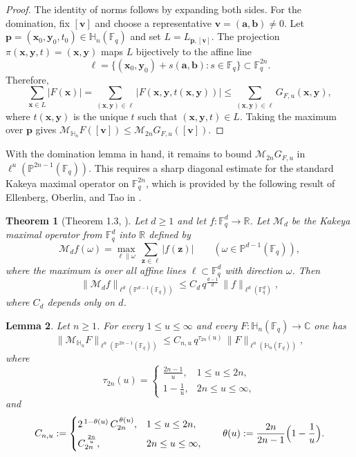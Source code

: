 \documentclass[11pt]{article}
\newtheorem{theorem}{Theorem}[section]
\newtheorem{lemma}[theorem]{Lemma}
\newcommand{\1}{\mathbf 1}
\newcommand{\bfp}{\mathbf{p}}
\begin{document}
\begin{proof}
The identity of norms follows by expanding both sides.
For the domination, fix $[\mathbf{v}]$ and choose a representative $\mathbf{v}=(\mathbf{a}, \mathbf{b})\ne 0$.
Let $\mathbf{p}=(\mathbf x_0, \mathbf y_0,t_0)\in\mathbb{H}_n(\mathbb{F}_q)$ and set $L=L_{\mathbf{p}, [\mathbf{v}]}$.
The projection $\pi(\mathbf x, \mathbf y,t)=(\mathbf x, \mathbf y)$ maps $L$ bijectively to the affine line
\[
\ell=\{(\mathbf x_0, \mathbf y_0)+s(\mathbf a, \mathbf b): s\in\mathbb{F}_q\}\subset \mathbb{F}_q^{2n}.
\]
Therefore,
\[
\sum_{\mathbf x\in L}|F(\mathbf x)|
=
\sum_{(\mathbf x, \mathbf y)\in \ell}|F(\mathbf x, \mathbf y,t(\mathbf x, \mathbf y))|
\le
\sum_{(\mathbf x, \mathbf y)\in \ell} G_{F,u}(\mathbf x, \mathbf y),
\]
where $t(\mathbf x, \mathbf y)$ is the unique $t$ such that $(\mathbf x, \mathbf y,t)\in L$.
Taking the maximum over $\bfp$ gives $\mathcal{M}_{\mathbb{H}_n}F([\mathbf{v}])\le \mathcal{M}_{2n}G_{F,u}([\mathbf{v}])$.
\end{proof}
With the domination lemma in hand, it remains to bound $\mathcal{M}_{2n}G_{F,u}$ in 
$\ell^u(\mathbb{P}^{2n-1}(\mathbb{F}_q))$. This requires a sharp diagonal estimate 
for the standard Kakeya maximal operator on $\mathbb{F}_q^{2n}$, which is provided 
by the following result of Ellenberg, Oberlin, and Tao in \cite{EOT}.
\begin{theorem}[Theorem 1.3, \cite{EOT}]\label{thm:EOT_lines}
Let $d\ge 1$ and let $f:\mathbb{F}_q^d\to\mathbb{R}$.
Let $\mathcal{M}_{d}$ be the Kakeya maximal operator from $\mathbb{F}_q^d$ into $\mathbb{R}$ defined by
\[
\mathcal{M}_{d} f(\omega)
=
\max_{\ell\parallel\omega}\ \sum_{\mathbf z\in \ell} |f(\mathbf z)|
\qquad
(\omega\in \mathbb{P}^{d-1}(\mathbb{F}_q)),
\]
where the maximum is over all affine lines $\ell\subset\mathbb{F}_q^d$ with direction $\omega$.
Then
\[
\|\mathcal{M}_d f\|_{\ell^d(\mathbb{P}^{d-1}(\mathbb{F}_q))}
\le
C_d\, q^{\frac{d-1}{d}}\,\|f\|_{\ell^d(\mathbb{F}_q^d)},
\]
where $C_d$ depends only on $d$.
\end{theorem}

\begin{lemma}\label{lem:Hn_diagonal}
Let $n\ge 1$.
For every $1\le u\le \infty$ and every $F:\mathbb{H}_n(\mathbb{F}_q)\to\mathbb{C}$ one has
\[
\|\mathcal{M}_{\mathbb{H}_n}F\|_{\ell^u(\mathbb{P}^{2n-1}(\mathbb{F}_q))}
\le
C_{n,u}\, q^{\tau_{2n}(u)}\, \|F\|_{\ell^u(\mathbb{H}_n(\mathbb{F}_q))},
\]
where
\[
\tau_{2n}(u)
=
\begin{cases}
\frac{2n-1}{u}, & 1\le u\le 2n,\\[4pt]
1-\frac1u, & 2n\le u\le \infty,
\end{cases}
\]
and
\[
C_{n,u}:=
\begin{cases}
2^{\,1-\theta(u)}\,C_{2n}^{\,\theta(u)}, & 1\le u\le 2n,\\[0.4em]
C_{2n}^{\,\frac{2n}{u}}, & 2n\le u\le \infty,
\end{cases}
\qquad
\theta(u):=\frac{2n}{2n-1}\Bigl(1-\frac1u\Bigr).
\]
\end{lemma}
\end{document}
